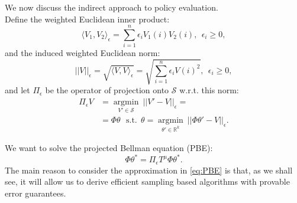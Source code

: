 We now discuss the indirect approach to policy evaluation.
\\
Define the weighted Euclidean inner product:
$$\langle V_1,V_2\rangle_\epsilon = {\sum_{i=1}^n \epsilon_i V_1(i)V_2(i)}, \ \ \epsilon_i\ge0,$$
and the induced weighted Euclidean norm:
$$||V||_\epsilon = \sqrt{\langle V,V\rangle_\epsilon} = \sqrt{\sum_{i=1}^n \epsilon_i V(i)^2}, \ \ \epsilon_i\ge0,$$
and let $\Pi_\epsilon$ be the operator of projection onto $\mathcal{S}$ w.r.t. this norm:
\begin{align*}\Pi_\epsilon V &=\underset{V' \in \mathcal{S}}{\operatorname{argmin}} \ ||V'-V||_\epsilon =\\
&= \Phi \theta \ \ \ \mathrm{s.t.} \ \ \theta = \underset{\theta' \in \mathbb{R}^k}{\operatorname{argmin}} \ ||\Phi \theta' - V||_\epsilon.\end{align*}

We want to solve the projected Bellman equation (PBE):
\begin{equation}\label{eq:PBE}
\Phi \theta^*  = \Pi_\epsilon T^\mu \Phi \theta^*.
\end{equation}
The main reason to consider the approximation in \eqref{eq:PBE} is that, as we shall see, it will allow us to derive efficient sampling based algorithms with provable error guarantees.

